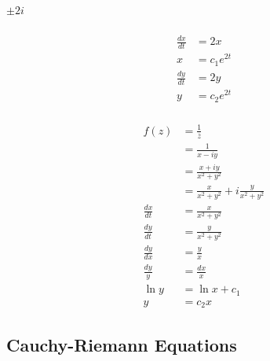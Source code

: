 \documentclass{article}
\begin{document}
\subsubsection{}

$\pm 2 i$

\setcounter{subsubsection}{40}
\subsubsection{}

\begin{align*}
  \frac{d x}{d t} & = 2 x         \\
  x               & = c_1 e^{2 t} \\
  \frac{d y}{d t} & = 2 y         \\
  y               & = c_2 e^{2 t}
\end{align*}

\setcounter{subsubsection}{42}
\subsubsection{}

\begin{align*}
  f(z)            & = \frac{1}{\overline{z}}                      \\
                  & = \frac{1}{x - i y}                           \\
                  & = \frac{x + i y}{x^2 + y^2}                   \\
                  & = \frac{x}{x^2 + y^2} + i \frac{y}{x^2 + y^2} \\
  \frac{d x}{d t} & = \frac{x}{x^2 + y^2}                         \\
  \frac{d y}{d t} & = \frac{y}{x^2 + y^2}                         \\
  \frac{d y}{d x} & = \frac{y}{x}                                 \\
  \frac{d y}{y}   & = \frac{d x}{x}                               \\
  \ln y           & = \ln x + c_1                                 \\
  y               & = c_2 x
\end{align*}

\subsection{Cauchy-Riemann Equations}

\subsubsection{}
\end{document}
